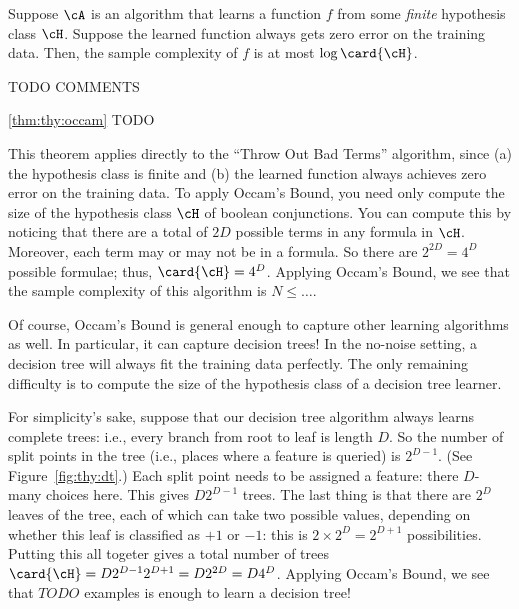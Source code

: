 \begin{theorem} \label{thm:thy:occam}
  Suppose $\cA$ is an algorithm that learns a function $f$ from some
  \emph{finite} hypothesis class $\cH$.  Suppose the learned function
  always gets zero error on the training data.  Then, the sample
  complexity of $f$ is at most $\log \card{\cH}$.
\end{theorem}

TODO COMMENTS

\begin{myproof}{\ref{thm:thy:occam}}
  TODO
\end{myproof}

This theorem applies directly to the ``Throw Out Bad Terms''
algorithm, since (a) the hypothesis class is finite and (b) the
learned function always achieves zero error on the training data.  To
apply Occam's Bound, you need only compute the size of the hypothesis
class $\cH$ of boolean conjunctions.  You can compute this by noticing
that there are a total of $2D$ possible terms in any formula in
$\cH$.  Moreover, each term may or may not be in a formula.  So there
are $2^{2D} = 4^D$ possible formulae; thus, $\card{\cH} = 4^D$.
Applying Occam's Bound, we see that the sample complexity of this
algorithm is $N \leq \dots$.

Of course, Occam's Bound is general enough to capture other learning
algorithms as well.  In particular, it can capture decision trees!  In
the no-noise setting, a decision tree will always fit the training
data perfectly.  The only remaining difficulty is to compute the size
of the hypothesis class of a decision tree learner.


For simplicity's sake, suppose that our decision tree algorithm always
learns complete trees: i.e., every branch from root to leaf is length
$D$.  So the number of split points in the tree (i.e., places where a
feature is queried) is $2^{D-1}$.  (See Figure~\ref{fig:thy:dt}.)
Each split point needs to be assigned a feature: there $D$-many
choices here.  This gives $D 2^{D-1}$ trees.  The last thing is that
there are $2^D$ leaves of the tree, each of which can take two
possible values, depending on whether this leaf is classified as $+1$
or $-1$: this is $2 \times 2^D = 2^{D+1}$ possibilities.  Putting this
all togeter gives a total number of trees $\card{\cH} = D 2^{D-1}
2^{D+1} = D 2^{2D} = D 4^D$.  Applying Occam's Bound, we see that
$TODO$ examples is enough to learn a decision tree!

